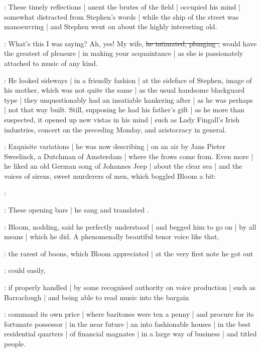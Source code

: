 :
These timely reflections |
anent the brutes of the field |
occupied his mind |
somewhat distracted from Stephen's words |
while the ship of the street was manoeuvring |
and Stephen went on about the highly interesting old.

\Bloom:
What's this I was saying?
Ah,
yes!
My wife,
\sout{he intimated, plunging ,}
would have the greatest of pleasure |
in making your acquaintance |
as she is passionately attached to music of any kind.

:
He looked sideways |
in a friendly fashion |
at the sideface of Stephen,
image of his mother,
which was not quite the same |
as the usual handsome blackguard type |
they unquestionably had an insatiable hankering after |
as he was perhaps |
not that way built.
Still,
supposing he had his father's gift |
as he more than suspected,
it opened up new vistas in his mind |
such as Lady Fingall's Irish industries,
concert on the preceding Monday,
and aristocracy in general.

:
Exquisite variations |
he was now describing |
on an air  by Jans Pieter Sweelinck,
a Dutchman of Amsterdam |
where the frows come from.
Even more |
he liked an old German song of Johannes Jeep |
about the clear sea |
and the voices of sirens,
sweet murderers of men,
which boggled Bloom a bit:

\Stephen:
\begin{verse}
\end{verse}

:
These opening bars |
he sang and translated .

:
Bloom,
nodding,
said he perfectly understood |
and begged him to go on |
by all means |
which he did.
A phenomenally beautiful tenor voice like that,%

:
the rarest of boons,
which Bloom appreciated |
at the very first note he got out

:
could easily,

:
if properly handled |
by some recognised authority on voice production |
such as Barraclough |
and being able to read music into the bargain

:
command its own price |
where baritones were ten a penny |
and procure for its fortunate possessor |
in the near future |
an  into fashionable houses |
in the best residential quarters |
of financial magnates |
in a large way of business |
and titled people.

